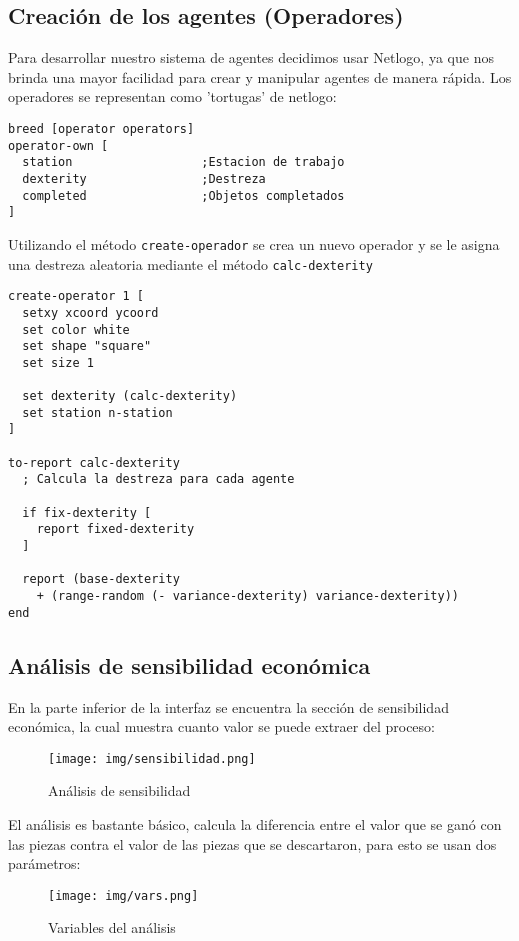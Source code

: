 \documentclass[11pt]{article}
\begin{document}
\subsection{Creación de los agentes (Operadores)}
\label{sec:org9681f32}
Para desarrollar nuestro sistema de agentes decidimos usar Netlogo, ya que nos brinda una mayor facilidad para crear y manipular agentes de manera rápida. Los operadores se representan como 'tortugas' de netlogo:

\begin{verbatim}
breed [operator operators]
operator-own [
  station                  ;Estacion de trabajo
  dexterity                ;Destreza
  completed                ;Objetos completados
]
\end{verbatim}

Utilizando el método \texttt{create-operador} se crea un nuevo operador y se le asigna una destreza aleatoria mediante el método \texttt{calc-dexterity}

\begin{verbatim}
create-operator 1 [
  setxy xcoord ycoord
  set color white
  set shape "square"
  set size 1

  set dexterity (calc-dexterity)
  set station n-station
]

to-report calc-dexterity
  ; Calcula la destreza para cada agente

  if fix-dexterity [
    report fixed-dexterity
  ]

  report (base-dexterity 
    + (range-random (- variance-dexterity) variance-dexterity))
end
\end{verbatim}

\subsection{Análisis de sensibilidad económica}
\label{sec:org8616b48}
En la parte inferior de la interfaz se encuentra la sección de sensibilidad económica, la cual muestra cuanto valor se puede extraer del proceso:

\begin{figure}[htbp]
\centering
\texttt{[image: img/sensibilidad.png]}
\caption{Análisis de sensibilidad}
\end{figure}

El análisis es bastante básico, calcula la diferencia entre el valor que se ganó con las piezas contra el valor de las piezas que se descartaron, para esto se usan dos parámetros:

\begin{figure}[htbp]
\centering
\texttt{[image: img/vars.png]}
\caption{Variables del análisis}
\end{figure}
\end{document}
